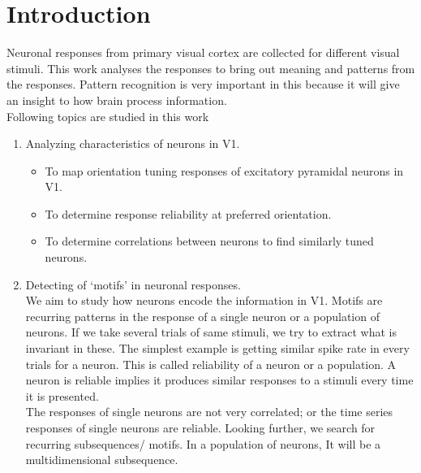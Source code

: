 \documentclass[11pt]{article}
\newcommand*{\titleGM}{\begingroup %
\hbox{ %
\hspace*{0.2\textwidth} %
\rule{1pt}{\textheight} %
\hspace*{0.05\textwidth} %
\parbox[b]{0.75\textwidth}{ %

{\noindent\Huge\bfseries  Neural data analysis}\\[2\baselineskip] %
{\large \textit{Notes}}\\[4\baselineskip] %
{\Large \textsc{Athul Vijayan \hspace{5pt} ed11b004}} %

\vspace{0.5\textheight} %
}}
\endgroup}
\begin{document}
\tableofcontents

\newpage
\section{Introduction} %
\label{sec:introduction}
Neuronal responses from primary visual cortex are collected for different visual stimuli. This work analyses the responses to bring out meaning and patterns from the responses. Pattern recognition is very important in this because it will give an insight to how brain process information.\\
Following topics are studied in this work
\begin{enumerate}
    \item Analyzing characteristics of neurons in V1.
    \begin{itemize}
        \item To map orientation tuning responses of excitatory pyramidal neurons in V1.
        \item To determine response reliability at preferred orientation.
        \item To determine correlations between neurons to find similarly tuned neurons.
    \end{itemize}
    \item Detecting of `motifs' in neuronal responses.\\
    We aim to study how neurons encode the information in V1. Motifs are recurring patterns in the response of a single neuron or a population of neurons. If we take several trials of same stimuli, we try to extract what is invariant in these. The simplest example is getting similar spike rate in every trials for a neuron. This is called reliability of a neuron or a population. A neuron is reliable implies it produces similar responses to a stimuli every time it is presented.\\
    The responses of single neurons are not very correlated; or the time series responses of single neurons are reliable. Looking further, we search for recurring subsequences/ motifs. In a population of neurons, It will be a multidimensional subsequence.\\

\end{enumerate}
\end{document}
